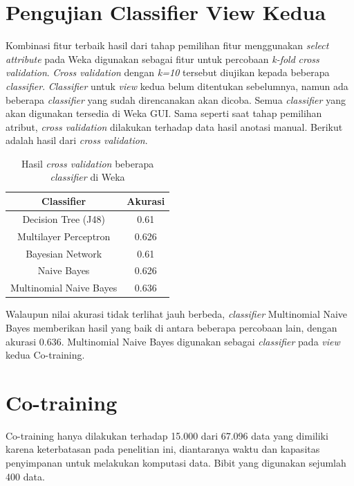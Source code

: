 \section{Pengujian Classifier View Kedua}
Kombinasi fitur terbaik hasil dari tahap pemilihan fitur menggunakan \textit{select attribute} pada Weka digunakan sebagai fitur untuk percobaan \textit{k-fold} \textit{cross validation}. \textit{Cross validation} dengan \textit{k=10} tersebut diujikan kepada beberapa \textit{classifier}. \textit{Classifier} untuk \textit{view} kedua belum ditentukan sebelumnya, namun ada beberapa \textit{classifier} yang sudah direncanakan akan dicoba. Semua \textit{classifier} yang akan digunakan tersedia di Weka GUI. Sama seperti saat tahap pemilihan atribut, \textit{cross validation} dilakukan terhadap data hasil anotasi manual. Berikut adalah hasil dari \textit{cross validation}.
\begin{table}
	\centering
	\caption{Hasil \textit{cross validation} beberapa \textit{classifier} di Weka}
	\label{table:classifierWeka}
	\begin{tabular}{|c|c|}
		\hline
		Classifier & Akurasi \\ \hline
		Decision Tree (J48) & 0.61 \\ \hline		
		Multilayer Perceptron & 0.626 \\ \hline
		Bayesian Network & 0.61 \\ \hline
		Naive Bayes & 0.626 \\ \hline
		Multinomial Naive Bayes & 0.636 \\ \hline
	\end{tabular}
\end{table}
\noindent Walaupun nilai akurasi tidak terlihat jauh berbeda, \textit{classifier} Multinomial Naive Bayes memberikan hasil yang baik di antara beberapa percobaan lain, dengan akurasi 0.636. Multinomial Naive Bayes digunakan sebagai \textit{classifier} pada \textit{view} kedua Co-training.
\section{Co-training}
Co-training hanya dilakukan terhadap 15.000 dari 67.096 data yang dimiliki karena keterbatasan pada penelitian ini, diantaranya waktu dan kapasitas penyimpanan untuk melakukan komputasi data. Bibit yang digunakan sejumlah 400 data.

